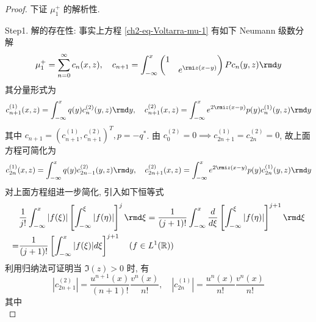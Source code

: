 \begin{proof}
    下证 $ \mu_{1}^{+} $ 的解析性.

    Step1. 解的存在性: 事实上方程 \eqref{ch2-eq-Voltarra-mu-1} 有如下 Neumann 级数分解
    \begin{equation}
        \mu_{1}^{+} = \sum_{n=0}^{\infty} c_{n}(x,z), \quad c_{n+1} = \int_{-\infty}^{x} \begin{pmatrix} 1 &  \\  & e^{ \rmi z (x - y)} \end{pmatrix} P c_{n}(y,z) \rmd y \label{ch2-eq-Neumann-series-mu-1-plus}
    \end{equation}
    其分量形式为
    \begin{equation}
        c_{n+1}^{(1)}(x,z) = \int_{-\infty}^{x} q(y) c_{n}^{(2)}(y,z) \rmd y, \quad c_{n+1}^{(2)}(x,z) = \int_{-\infty}^{x} e^{2 \rmi z(x-y)} p(y) c_{n}^{(1)}(y,z) \rmd y
    \end{equation}
    其中  $c_{n+1} = (c_{n+1}^{(1)}, c_{n+1}^{(2)})^T, p = -q^{*} $.
    由 $ c_{0}^{(2)} = 0 \implies c_{2n+1}^{(1)} = c_{2n}^{(2)} = 0 $, 故上面方程可简化为
    \begin{equation}
        c_{2n}^{(1)}(x,z) = \int_{-\infty}^{x} q(y) c_{2n-1}^{(2)}(y,z) \rmd y, \quad c_{2n+1}^{(2)}(x,z) = \int_{-\infty}^{x} e^{2 \rmi z(x-y)} p(y) c_{2n}^{(1)}(y,z) \rmd y \label{ch2-eq-Neumann-series-coefficient}
    \end{equation}
    对上面方程组进一步简化, 引入如下恒等式
    \begin{equation}
        \begin{aligned}
              & \frac{1}{j!} \int_{-\infty}^{x} | f(\xi) | \left[\int_{-\infty}^{\xi} | f(\eta) | \right]^{j} \rmd \xi = \frac{1}{(j+1)!} \int_{-\infty}^{x} \frac{d}{d \xi} \left[\int_{-\infty}^{\xi} | f(\eta) | \right]^{j+1} \rmd \xi \\
            = & \frac{1}{(j+1)!} \left[\int_{-\infty}^{x} | f(\xi) | d \xi \right]^{j+1} \quad (f \in L^{1}(\mathbb{R}))
        \end{aligned} \label{ch2-eq-Neumann-series-coefficient-identity}
    \end{equation}
    利用归纳法可证明当 $ \Im(z) > 0 $ 时, 有
    \begin{equation}
        |c_{2n+1}^{(2)} | = \frac{u^{n+1}(x)}{(n+1)!} \frac{v^{n}(x)}{n!} , \quad |c_{2n}^{(1)} | = \frac{u^{n}(x)}{n!} \frac{v^{n}(x)}{n!} \label{ch2-eq-Recurrence-relation}
    \end{equation}
    其中
    \begin{equation}

\end{equation}
\end{proof}
